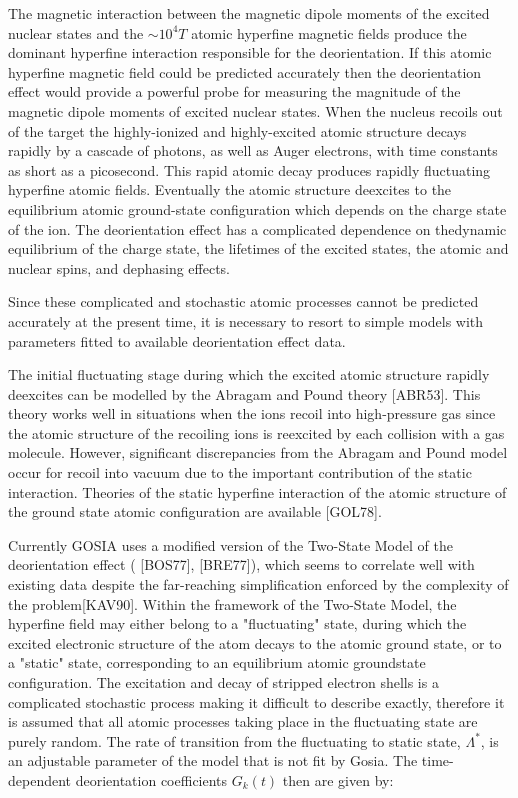 \documentclass[10pt]{article}
\begin{document}
The magnetic interaction between the magnetic dipole moments of the excited nuclear states and the $\sim 10^{4} T$ atomic hyperfine magnetic fields produce the dominant hyperfine interaction responsible for the deorientation. If this atomic hyperfine magnetic field could be predicted accurately then the deorientation effect would provide a powerful probe for measuring the magnitude of the magnetic dipole moments of excited nuclear states. When the nucleus recoils out of the target the highly-ionized and highly-excited atomic structure decays rapidly by a cascade of photons, as well as Auger electrons, with time constants as short as a picosecond. This rapid atomic decay produces rapidly fluctuating hyperfine atomic fields. Eventually the atomic structure deexcites to the equilibrium atomic ground-state configuration which depends on the charge state of the ion. The deorientation effect has a complicated dependence on thedynamic equilibrium of the charge state, the lifetimes of the excited states, the atomic and nuclear spins, and dephasing effects.

Since these complicated and stochastic atomic processes cannot be predicted accurately at the present time, it is necessary to resort to simple models with parameters fitted to available deorientation effect data.

The initial fluctuating stage during which the excited atomic structure rapidly deexcites can be modelled by the Abragam and Pound theory [ABR53]. This theory works well in situations when the ions recoil into high-pressure gas since the atomic structure of the recoiling ions is reexcited by each collision with a gas molecule. However, significant discrepancies from the Abragam and Pound model occur for recoil into vacuum due to the important contribution of the static interaction. Theories of the static hyperfine interaction of the atomic structure of the ground state atomic configuration are available [GOL78].

Currently GOSIA uses a modified version of the Two-State Model of the deorientation effect ( [BOS77], [BRE77]), which seems to correlate well with existing data despite the far-reaching simplification enforced by the complexity of the problem[KAV90]. Within the framework of the Two-State Model, the hyperfine field may either belong to a "fluctuating" state, during which the excited electronic structure of the atom decays to the atomic ground state, or to a "static" state, corresponding to an equilibrium atomic groundstate configuration. The excitation and decay of stripped electron shells is a complicated stochastic process making it difficult to describe exactly, therefore it is assumed that all atomic processes taking place in the fluctuating state are purely random. The rate of transition from the fluctuating to static state, $\Lambda^{*}$, is an adjustable parameter of the model that is not fit by Gosia. The time-dependent deorientation coefficients $G_{k}(t)$ then are given by:
\end{document}
